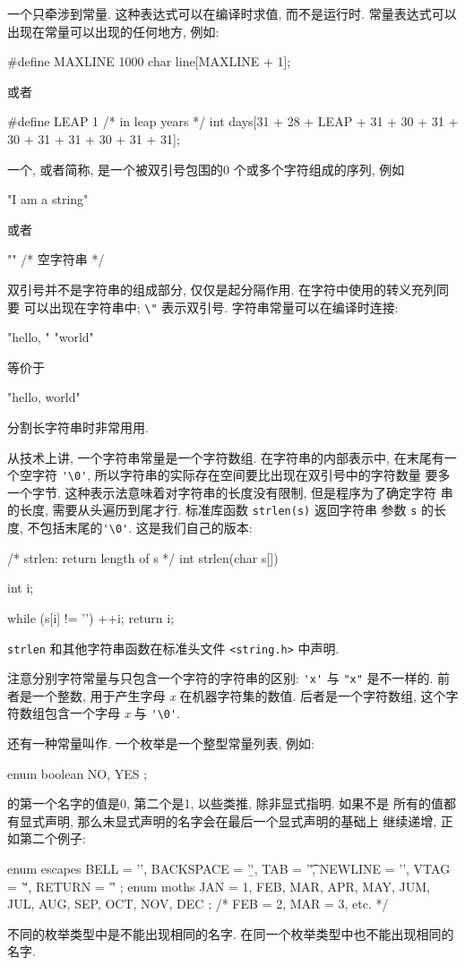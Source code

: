 一个只牵涉到常量. 这种表达式可以在编译时求值,
而不是运行时. 常量表达式可以出现在常量可以出现的任何地方, 例如:
\begin{myverbatim}
    #define MAXLINE 1000
    char line[MAXLINE + 1];
\end{myverbatim}
或者
\begin{myverbatim}
    #define LEAP 1 /* in leap years */
    int days[31 + 28 + LEAP + 31 + 30 + 31 + 30 + 31 + 31 + 30 + 31 + 31];
\end{myverbatim}
一个, 或者简称, 是一个被双引号包围的0
个或多个字符组成的序列, 例如 
\begin{myverbatim}
    "I am a string"
\end{myverbatim}
或者 
\begin{myverbatim}
    ""  /* 空字符串 */
\end{myverbatim}
双引号并不是字符串的组成部分, 仅仅是起分隔作用. 在字符中使用的转义充列同要
可以出现在字符串中; \verb=\"= 表示双引号. 字符串常量可以在编译时连接:
\begin{myverbatim}
    "hello, " "world"
\end{myverbatim}
等价于
\begin{myverbatim}
    "hello, world"
\end{myverbatim}
分割长字符串时非常用用.

从技术上讲, 一个字符串常量是一个字符数组. 在字符串的内部表示中, 在末尾有一
个空字符 \verb"'\0'", 所以字符串的实际存在空间要比出现在双引号中的字符数量
要多一个字节. 这种表示法意味着对字符串的长度没有限制, 但是程序为了确定字符
串的长度, 需要从头遍历到尾才行. 标准库函数 \texttt{strlen(s)} 返回字符串
参数 \verb"s" 的长度, 不包括末尾的\verb"'\0'". 这是我们自己的版本:
\begin{myverbatim}
    /* strlen: return length of s */
    int strlen(char s[])
    {
        int i;

        while (s[i] != '\0')
            ++i;
        return i;
    }
\end{myverbatim}
\texttt{strlen} 和其他字符串函数在标准头文件 \verb"<string.h>" 中声明.

注意分别字符常量与只包含一个字符的字符串的区别: \verb"'x'" 与 \verb="x"= 
是不一样的. 前者是一个整数, 用于产生字母 \textit{x} 在机器字符集的数值.
后者是一个字符数组, 这个字符数组包含一个字母 \textit{x} 与 \verb"'\0'".

还有一种常量叫作. 一个枚举是一个整型常量列表, 例如:
\begin{myverbatim}
    enum boolean { NO, YES };
\end{myverbatim}
\cenum 的第一个名字的值是0, 第二个是1, 以些类推, 除非显式指明. 如果不是
所有的值都有显式声明, 那么未显式声明的名字会在最后一个显式声明的基础上
继续递增, 正如第二个例子:
\begin{myverbatim}
    enum escapes { BELL = '\a', BACKSPACE = '\b', TAB = '\t',
                   NEWLINE = '\n', VTAG = '\v', RETURN = '\r' };
    enum moths { JAN = 1, FEB, MAR, APR, MAY, JUM,
                 JUL, AUG, SEP, OCT, NOV, DEC };
                 /* FEB = 2, MAR = 3, etc. */
\end{myverbatim}
不同的枚举类型中是不能出现相同的名字. 在同一个枚举类型中也不能出现相同的
名字.

